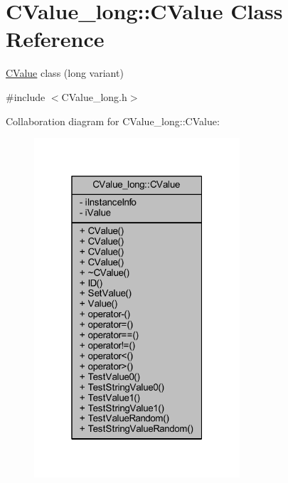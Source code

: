 \hypertarget{class_c_value__long_1_1_c_value}{}\section{C\+Value\+\_\+long\+:\+:C\+Value Class Reference}
\label{class_c_value__long_1_1_c_value}


\hyperlink{class_c_value__long_1_1_c_value}{C\+Value} class ({\ttfamily long} variant)  




{\ttfamily \#include $<$C\+Value\+\_\+long.\+h$>$}



Collaboration diagram for C\+Value\+\_\+long\+:\+:C\+Value\+:\nopagebreak
\begin{figure}[H]
\begin{center}
\leavevmode
\includegraphics[width=217pt]{class_c_value__long_1_1_c_value__coll__graph}
\end{center}
\end{figure}

